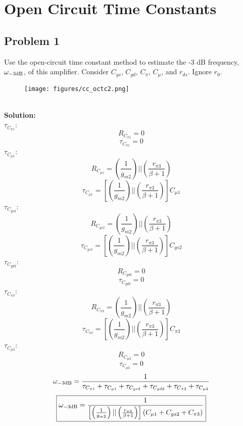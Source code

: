 \documentclass{article}
\begin{document}
\section*{Open Circuit Time Constants}
\subsection*{Problem 1}
Use the open-circuit time constant method to estimate the -3 dB frequency, $\omega_{\rm -3 dB}$, of this amplifier.  Consider $C_{gs}$, $C_{gd}$, $C_{\pi}$, $C_{\mu}$, and $r_{ds}$.  Ignore $r_0$. \\ 
\begin{figure}[!h]
\begin{center}
    \texttt{[image: figures/cc\_octc2.png]}
\end{center}
\end{figure} \\
\textbf{Solution:} \\
$\tau_{C_{\pi 1}}$:
$$R_{C_{\pi 1}} = 0$$
$$\boxed{\tau_{C_{\pi 1}} = 0}$$
$\tau_{C_{\mu 1}}$:
$$R_{C_{\mu 1}} = \left(\frac{1}{g_{m2}}\right) || \left(\frac{r_{\pi 3}}{\beta + 1}\right) $$
$$\boxed{\tau_{C_{\mu 1}} = \left[\left(\frac{1}{g_{m2}}\right) || \left(\frac{r_{\pi 3}}{\beta + 1}\right)\right]C_{\mu 1}}$$
$\tau_{C_{gs2}}$:
$$R_{C_{gs2}} = \left(\frac{1}{g_{m2}}\right) || \left(\frac{r_{\pi 3}}{\beta + 1}\right) $$
$$\boxed{\tau_{C_{gs2}} = \left[\left(\frac{1}{g_{m2}}\right) || \left(\frac{r_{\pi 3}}{\beta + 1}\right)\right]C_{gs 2}}$$
$\tau_{C_{gd2}}$:
$$R_{C_{gd2}} = 0$$
$$\boxed{\tau_{C_{gd2}} = 0}$$
$\tau_{C_{\pi 3}}$:
$$R_{C_{\pi 3}} = \left(\frac{1}{g_{m2}}\right) || \left(\frac{r_{\pi 3}}{\beta + 1}\right) $$
$$\boxed{\tau_{C_{\pi 3}} = \left[\left(\frac{1}{g_{m2}}\right) || \left(\frac{r_{\pi 3}}{\beta + 1}\right)\right]C_{\pi 3}}$$
$\tau_{C_{\mu 3}}$:
$$R_{C_{\mu 3}} = 0 $$
$$\boxed{\tau_{C_{\mu 3}} = 0}$$
$$\omega_{\rm -3dB} = \frac{1}{\tau_{C_{\pi 1}} + \tau_{C_{\mu 1}} + \tau_{C_{gs2}} + \tau_{C_{gd2}} + \tau_{C_{\pi 3}} + \tau_{C_{\mu 3}}}$$
$$\boxed{\omega_{\rm -3 dB} = \frac{1}{\left[\left(\frac{1}{g_{m2}}\right) || \left(\frac{r_{\pi 3}}{\beta + 1}\right)\right](C_{\mu 1} + C_{gs 2} + C_{\pi 3})}}$$
\newpage
\end{document}
